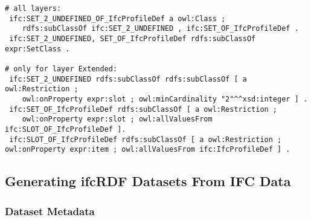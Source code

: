 

\begin{lstlisting}
# all layers:
 ifc:SET_2_UNDEFINED_OF_IfcProfileDef a owl:Class ;
    rdfs:subClassOf ifc:SET_2_UNDEFINED , ifc:SET_OF_IfcProfileDef .
 ifc:SET_2_UNDEFINED, SET_OF_IfcProfileDef rdfs:subClassOf expr:SetClass .

# only for layer Extended:
 ifc:SET_2_UNDEFINED rdfs:subClassOf rdfs:subClassOf [ a owl:Restriction ;
    owl:onProperty expr:slot ; owl:minCardinality "2"^^xsd:integer ] .
 ifc:SET_OF_IfcProfileDef rdfs:subClassOf [ a owl:Restriction ;
    owl:onProperty expr:slot ; owl:allValuesFrom ifc:SLOT_OF_IfcProfileDef ].
 ifc:SLOT_OF_IfcProfileDef rdfs:subClassOf [ a owl:Restriction ; owl:onProperty expr:item ; owl:allValuesFrom ifc:IfcProfileDef ] .
\end{lstlisting}



\subsection{Generating ifcRDF Datasets From IFC Data}
\label{sec:ifcRDF}

\subsubsection{Dataset Metadata}

